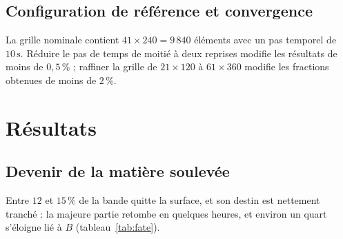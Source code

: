 \documentclass[11pt,a4paper]{article}
\begin{document}
\subsection{Configuration de référence et convergence}
\noindent{}
\vspace{0.5em}

La grille nominale contient $41 \times 240 = 9\,840$ éléments avec un pas temporel de $10\,\mathrm{s}$. Réduire le pas de temps de moitié à deux reprises modifie les résultats de moins de $0{,}5\,\%$ ; raffiner la grille de $21 \times 120$ à $61 \times 360$ modifie les fractions obtenues de moins de $2\,\%$.

\section{Résultats}

\subsection{Devenir de la matière soulevée}
Entre $12$ et $15\,\%$ de la bande quitte la surface, et son destin est nettement tranché : la majeure partie retombe en quelques heures, et environ un quart s'éloigne lié à $B$ (tableau~\ref{tab:fate}).
\end{document}
